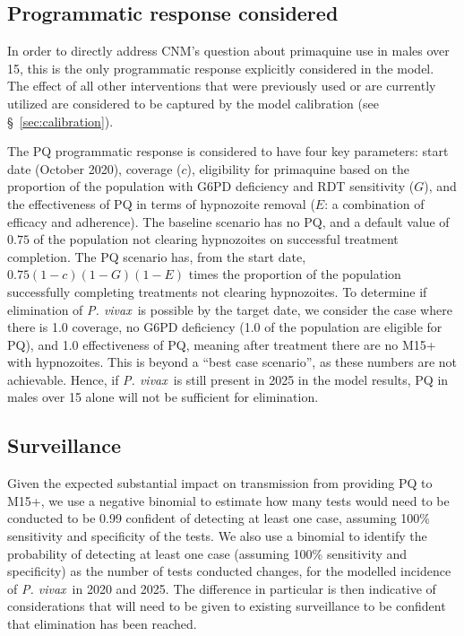\documentclass[doublespacing]{bmcart}
\newcommand{\pv}{\textit{P. vivax}}
\begin{document}
\subsection*{Programmatic response considered}
In order to directly address CNM's question about primaquine use in males over 15, this is the only programmatic response explicitly considered in the model. The effect of all other interventions that were previously used or are currently utilized are considered to be captured by the model calibration (see \S~\ref{sec:calibration}).

The PQ programmatic response is considered to have four key parameters: start date (October 2020), coverage ($c$), eligibility for primaquine based on the proportion of the population with G6PD deficiency and RDT sensitivity ($G$), and the effectiveness of PQ in terms of hypnozoite removal ($E$: a combination of efficacy and adherence). The baseline scenario has no PQ, and a default value of $0.75$ of the population not clearing hypnozoites on successful treatment completion. The PQ scenario has, from the start date, $0.75(1-c)(1-G)(1-E)$ times the proportion of the population successfully completing treatments not clearing hypnozoites.  To determine if elimination of \pv~is possible by the target date, we consider the case where there is 1.0 coverage, no G6PD deficiency (1.0 of the population are eligible for PQ), and 1.0 effectiveness of PQ, meaning after treatment there are no M15+ with hypnozoites. This is beyond a ``best case scenario'', as these numbers are not achievable. Hence, if \pv~is still present in 2025 in the model results, PQ in males over 15 alone will not be sufficient for elimination.  

\subsection*{Surveillance}
Given the expected substantial impact on transmission from providing PQ to M15+, we use a negative binomial to estimate how many tests would need to be conducted to be 0.99 confident of detecting at least one case, assuming 100\% sensitivity and specificity of the tests. We also use a binomial to identify the probability of detecting at least one case (assuming 100\% sensitivity and specificity) as the number of tests conducted changes, for the modelled incidence of \pv~in 2020 and 2025. The difference in particular is then indicative of considerations that will need to be given to existing surveillance to be confident that elimination has been reached.
\end{document}
